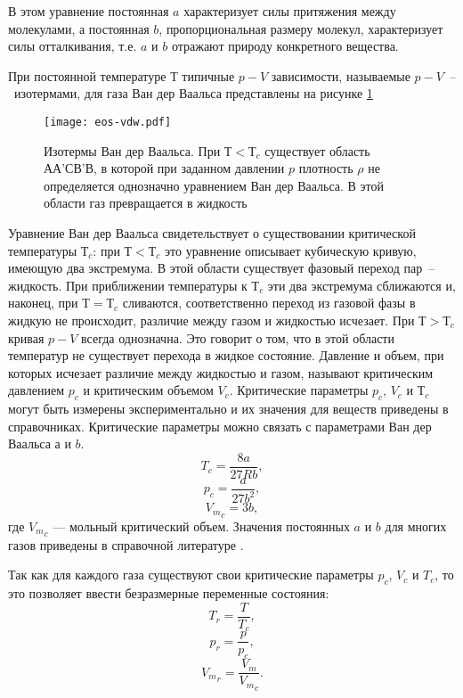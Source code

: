 В этом уравнение постоянная $a$ характеризует силы притяжения между молекулами, а постоянная $b$, пропорциональная размеру молекул, характеризует силы отталкивания, т.е. $a$ и $b$ отражают природу конкретного вещества.

При постоянной температуре $Т$ типичные $p-V$ зависимости, называемые $p-V$~--~изотермами, для газа Ван дер Ваальса представлены на рисунке \ref{fig:eos.vdw}

\begin{figure}[h]
	\begin{center}
		\texttt{[image: eos-vdw.pdf]}
	\end{center}
	\caption{Изотермы Ван дер Ваальса. При $Т < Т_c$ существует область АА'СВ’В, в которой при заданном давлении $p$ плотность $\rho$ не определяется однозначно уравнением Ван дер Ваальса. В этой области газ превращается в жидкость} \label{fig:eos.vdw}
\end{figure}

Уравнение Ван дер Ваальса свидетельствует о существовании критической температуры $Т_{c}$: при $Т < Т_{c}$ это уравнение описывает кубическую кривую, имеющую два экстремума. В этой области существует фазовый переход пар~-- жидкость. При приближении температуры к $Т_{c}$ эти два экстремума сближаются и, наконец, при $Т=Т_{c}$ сливаются, соответственно переход из газовой фазы в жидкую не происходит, различие между газом и жидкостью исчезает.
При $Т > Т_{c}$ кривая $p-V$ всегда однозначна. Это говорит о том, что в этой области температур не существует перехода в жидкое состояние. Давление и объем, при которых исчезает различие между жидкостью и газом, называют критическим давлением $p_{c}$ и критическим объемом $V_{c}$. Критические параметры $p_{c}$, $V_{c}$ и $Т_c$ могут быть измерены экспериментально и их значения для веществ приведены в справочниках. Критические параметры можно связать с параметрами Ван дер Ваальса $а$ и $b$. 
\begin{equation}
	T_{c}=\dfrac{8 a}{27 R b},
\end{equation}
\begin{equation}
	p_{c}=\dfrac{a}{27 b^2},
\end{equation}
\begin{equation}
	{V_m}_{c}=3 b,
\end{equation}
где ${V_m}_{c}$ --- мольный критический объем. Значения постоянных $a$ и $b$ для многих газов приведены в справочной литературе \cite{rid1982}.

Так как для каждого газа существуют свои критические параметры $p_{c}$, $V_{c}$ и $T_{c}$, то это позволяет ввести безразмерные переменные состояния:
\begin{equation}
	T_{r}=\dfrac{T}{T_{c}},
\end{equation}
\begin{equation}
	p_{r}=\dfrac{p}{p_{c}},
\end{equation}
\begin{equation}
	{V_m}_{r}=\dfrac{V_m}{{V_m}_{c}}.
\end{equation}

